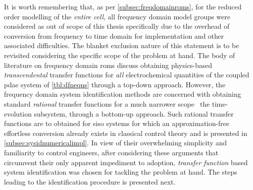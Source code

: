 \addlines[1]
It  is  worth remembering  that,  as  per \cref{subsec:freqdomainroms}, for  the
reduced order  modelling of the  \emph{entire cell}, all frequency  domain model
groups were considered  as out of scope  of this thesis specifically  due to the
overhead  of conversion  from frequency  to time  domain for  implementation and
other associated difficulties. The blanket exclusion nature of this statement is
to be revisited considering the specific scope  of the problem at hand. The body
of literature  on frequency  domain \glspl{rom} discuss  obtaining physics-based
\emph{transcendental}   transfer   functions  for   \emph{all}   electrochemical
quantities  of the  coupled  \gls{pdae} system  of \cref{tbl:dfneqns} through  a
top-down approach.  However, the frequency domain  system identification methods
are concerned with  obtaining standard \emph{rational} transfer  functions for a
much narrower  scope \viz~the time-evolution  subsystem, through  a bottom-up
approach.  Such  rational transfer  functions  are  to obtained  for  \gls{siso}
systems for which an approximation-free  effortless conversion already exists in
classical control  theory and is  presented in \cref{subsec:sysidnumericalimpl}.
In view of  their overwhelming simplicity and familiarity  to control engineers,
after considering these arguments that circumvent their only apparent impediment
to adoption, \emph{transfer function} based system identification was chosen for
tackling the problem at hand. The  steps leading to the identification procedure
is presented next.



